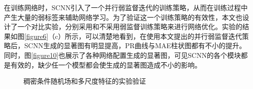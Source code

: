 在训练网络时，SCNN引入了一个并行弱监督迭代的训练策略，从而在训练过程中产生大量的弱标签来辅助网络学习。为了验证这一个训练策略的有效性，本文也设计了一个对比实验，分别采用和不采用弱监督训练策略来进行网络优化。实验的结果如图\ref{figure6}（c）所示，可以清楚地看到，在使用本文提出的并行弱监督迭代策略后，SCNN生成的显著图有明显提高，PR曲线与MAE柱状图都有不小的提升。同时，图\ref{figure10}也展示了各种网络配置生成的显著图，可见SCNN的各个模块都是有效的，缺少任一个模型都会使生成的显著图造成不小的影响。

\begin{figure}[tbp]
\center
{}
\caption{稠密条件随机场和多尺度特征的实验验证}
\label{diff_config}
\end{figure}

